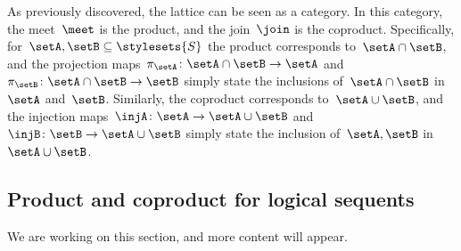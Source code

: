 \begin{figure}[h]
  \begin{center}
  \end{center}
  \caption{}
  \label{fig:prod_coprod_power}
\end{figure}
As previously discovered, the lattice can be seen as a category.
In this category, the meet~$\meet$ is the product, and the join~$\join$ is the coproduct.
Specifically, for~$\setA,\setB\subseteq \stylesets{S}$ the product corresponds to~$\setA\cap \setB$, and the projection maps~$\pi_\setA\colon \setA\cap \setB\to \setA$ and~$\pi_\setB\colon \setA\cap \setB\to \setB$ simply state the inclusions of~$\setA\cap \setB$ in~$\setA$ and~$\setB$.
Similarly, the coproduct corresponds to~$\setA\cup \setB$, and the injection maps~$\injA\colon \setA\to \setA\cup \setB$ and~$\injB\colon \setB\to \setA\cup \setB$ simply state the inclusion of~$\setA,\setB$ in~$\setA\cup \setB$.

\subsection{Product and coproduct for logical sequents}
We are working on this section, and more content will appear.


